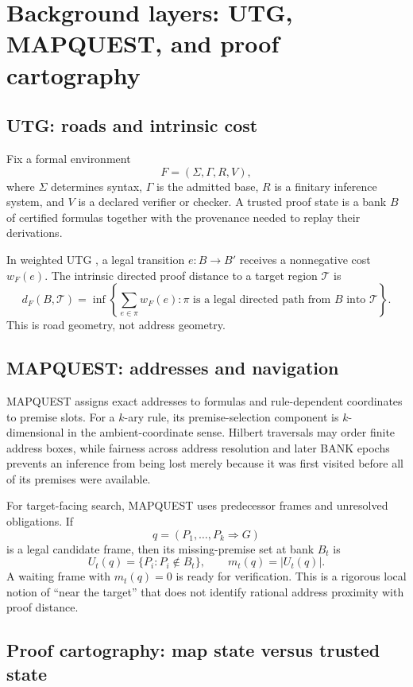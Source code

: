 \documentclass[11pt]{article}
\begin{document}
\section{Background layers: UTG, MAPQUEST, and proof cartography}

\subsection{UTG: roads and intrinsic cost}

Fix a formal environment
\[
F=(\Sigma,\Gamma,R,V),
\]
where $\Sigma$ determines syntax, $\Gamma$ is the admitted base, $R$ is a finitary inference system, and $V$ is a declared verifier or checker. A trusted proof state is a bank $B$ of certified formulas together with the provenance needed to replay their derivations.

In weighted UTG \cite{UTGII}, a legal transition $e:B\to B'$ receives a nonnegative cost $w_F(e)$. The intrinsic directed proof distance to a target region $\mathcal T$ is
\[
d_F(B,\mathcal T)
=
\inf\left\{\sum_{e\in\pi} w_F(e):\pi\text{ is a legal directed path from }B\text{ into }\mathcal T\right\}.
\]
This is road geometry, not address geometry.

\subsection{MAPQUEST: addresses and navigation}

MAPQUEST \cite{MQFair,MQRect,MQCert} assigns exact addresses to formulas and rule-dependent coordinates to premise slots. For a $k$-ary rule, its premise-selection component is $k$-dimensional in the ambient-coordinate sense. Hilbert traversals may order finite address boxes, while fairness across address resolution and later BANK epochs prevents an inference from being lost merely because it was first visited before all of its premises were available.

For target-facing search, MAPQUEST uses predecessor frames and unresolved obligations. If
\[
q=(P_1,\ldots,P_k\Rightarrow G)
\]
is a legal candidate frame, then its missing-premise set at bank $B_t$ is
\[
U_t(q)=\{P_i:P_i\notin B_t\},
\qquad
m_t(q)=|U_t(q)|.
\]
A waiting frame with $m_t(q)=0$ is ready for verification. This is a rigorous local notion of ``near the target'' that does not identify rational address proximity with proof distance.

\subsection{Proof cartography: map state versus trusted state}
\end{document}
